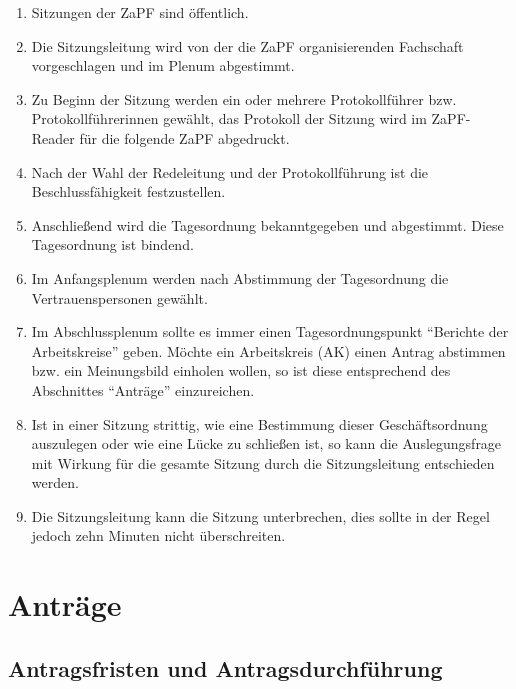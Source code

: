 \documentclass[draft,12pt,oneside]{scrreprt}
\begin{document}
\begin{enumerate}
\item Sitzungen der ZaPF sind öffentlich.

\item Die Sitzungsleitung wird von der die ZaPF organisierenden Fachschaft
      vorgeschlagen und im Plenum abgestimmt.

\item Zu Beginn der Sitzung werden ein oder mehrere Protokollführer bzw.
      Protokollführerinnen gewählt, das Protokoll der Sitzung wird im
      ZaPF-Reader für die folgende ZaPF abgedruckt.

\item Nach der Wahl der Redeleitung und der Protokollführung ist die
      Beschlussfähigkeit festzustellen.

\item Anschließend wird die Tagesordnung bekanntgegeben und abgestimmt.
      Diese Tagesordnung ist bindend.

\item Im Anfangsplenum werden nach Abstimmung der Tagesordnung die
      Vertrauenspersonen gewählt.

\item Im Abschlussplenum sollte es immer einen Tagesordnungspunkt ``Berichte
      der Arbeitskreise'' geben.
      Möchte ein Arbeitskreis (AK) einen Antrag abstimmen bzw. ein Meinungsbild
      einholen wollen, so ist diese entsprechend des Abschnittes ``Anträge''
      einzureichen.

\item Ist in einer Sitzung strittig, wie eine Bestimmung dieser Geschäftsordnung
      auszulegen oder wie eine Lücke zu schließen ist, so kann die Auslegungsfrage
      mit Wirkung für die gesamte Sitzung durch die Sitzungsleitung entschieden
      werden.

\item Die Sitzungsleitung kann die Sitzung unterbrechen, dies sollte in der
      Regel jedoch zehn Minuten nicht überschreiten.
\end{enumerate}

\section{Anträge}

\subsection{Antragsfristen und Antragsdurchführung}
\end{document}
